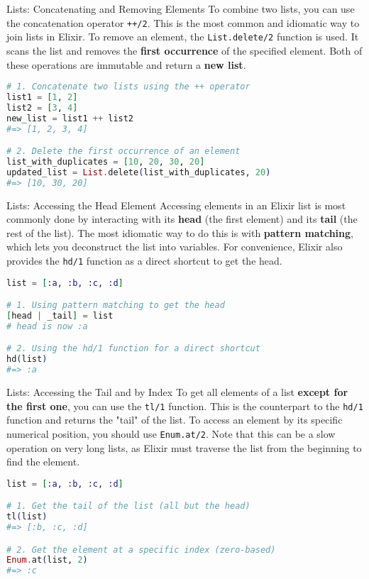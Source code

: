 \documentclass[aspectratio=169, table]{beamer}
\begin{document}
\begin{frame}[fragile]{Lists: Concatenating and Removing Elements}
\vspace{20pt}
To combine two lists, you can use the concatenation operator \texttt{++/2}. This is the most common and idiomatic way to join lists in Elixir. To remove an element, the \texttt{List.delete/2} function is used. It scans the list and removes the \textbf{first occurrence} of the specified element. Both of these operations are immutable and return a \textbf{new list}.

\begin{lstlisting}[language=Elixir]
# 1. Concatenate two lists using the ++ operator
list1 = [1, 2]
list2 = [3, 4]
new_list = list1 ++ list2
#=> [1, 2, 3, 4]

# 2. Delete the first occurrence of an element
list_with_duplicates = [10, 20, 30, 20]
updated_list = List.delete(list_with_duplicates, 20)
#=> [10, 30, 20]
\end{lstlisting}
\end{frame}

\begin{frame}[fragile]{Lists: Accessing the Head Element}
\vspace{20pt}
Accessing elements in an Elixir list is most commonly done by interacting with its \textbf{head} (the first element) and its \textbf{tail} (the rest of the list). The most idiomatic way to do this is with \textbf{pattern matching}, which lets you deconstruct the list into variables. For convenience, Elixir also provides the \texttt{hd/1} function as a direct shortcut to get the head.

\begin{lstlisting}[language=Elixir]
list = [:a, :b, :c, :d]

# 1. Using pattern matching to get the head
[head | _tail] = list
# head is now :a

# 2. Using the hd/1 function for a direct shortcut
hd(list)
#=> :a
\end{lstlisting}
\end{frame}

\begin{frame}[fragile]{Lists: Accessing the Tail and by Index}
\vspace{20pt}
To get all elements of a list \textbf{except for the first one}, you can use the \texttt{tl/1} function. This is the counterpart to the \texttt{hd/1} function and returns the "tail" of the list. To access an element by its specific numerical position, you should use \texttt{Enum.at/2}. Note that this can be a slow operation on very long lists, as Elixir must traverse the list from the beginning to find the element.

\begin{lstlisting}[language=Elixir]
list = [:a, :b, :c, :d]

# 1. Get the tail of the list (all but the head)
tl(list)
#=> [:b, :c, :d]

# 2. Get the element at a specific index (zero-based)
Enum.at(list, 2)
#=> :c
\end{lstlisting}
\end{frame}
\end{document}
